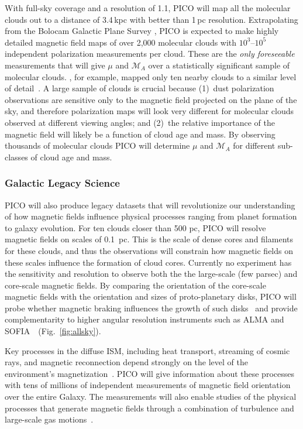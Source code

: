 \documentclass[PICOReport.tex]{subfiles}
\begin{document}
With full-sky coverage and a resolution of 1.1\arcmin, PICO will map all the molecular clouds out to a distance of 3.4\,kpc with better than 1\,pc resolution.  Extrapolating from the Bolocam Galactic Plane Survey \citep[BGPS,][]{EllsworthBowers2015}, PICO is expected to make highly detailed magnetic field maps of over 2,000 molecular clouds with $10^3$--$10^5$  independent polarization measurements per cloud. These are the {\it only foreseeable} measurements that will give $\mu$ and $\mathcal{M}_A$ over a statistically significant sample of molecular clouds. \planck , for example, mapped only ten nearby clouds to a similar level of detail~\citep{Planck:XXXV}. A large sample of clouds is crucial because (1)~dust polarization observations are sensitive only to the magnetic field projected on the plane of the sky, and therefore polarization maps will look very different for molecular clouds observed at different viewing angles; and (2)~the relative importance of the magnetic field will likely be a function of cloud age and mass. By observing thousands of molecular clouds PICO will determine $\mu$ and  $\mathcal{M}_A$ for different sub-classes of cloud age and mass. 

\subsubsection{Galactic Legacy Science}
\label{sec:galactic_legacy}

PICO will also produce legacy datasets that will revolutionize our understanding of how magnetic fields influence physical processes ranging from planet formation to galaxy evolution.  For ten clouds closer than 500 pc, PICO will resolve magnetic fields on scales of 0.1~pc. This is the scale of dense cores and filaments for these clouds, and thus the observations will constrain how magnetic fields on these scales influence the formation of cloud cores.  Currently no experiment has the sensitivity and resolution to observe both the the large-scale (few parsec) and core-scale magnetic fields. By comparing the orientation of the core-scale magnetic fields with the orientation and sizes of proto-planetary disks, PICO will probe whether magnetic braking influences the growth of such disks~\citep{allen_2003,li_2014} and provide complementarity to higher angular resolution instruments such as ALMA and SOFIA~\citep{Bacciotti2018ApJ,Harper2018}~(Fig.~\ref{fig:allsky}).

Key processes in the diffuse ISM, including heat transport, streaming of cosmic rays, and magnetic reconnection depend strongly on the level of the environment's magnetization~\citep{Lazarian:2006,Lazarian:2016,Lazarian_Vishniac:1999}.
PICO will give information about these processes with tens of millions of independent measurements of magnetic field orientation over the entire Galaxy. The measurements will also enable studies of the physical processes that generate magnetic fields through a combination of turbulence and large-scale gas motions~\citep{Xu_2018}.
\end{document}
